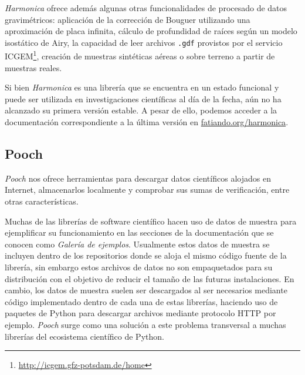 \emph{Harmonica} ofrece además algunas otras funcionalidades de procesado de
datos gravimétricos: aplicación de la corrección de Bouguer utilizando una
aproximación de placa infinita, cálculo de profundidad de raíces según un
modelo isostático de Airy, la capacidad de leer archivos \texttt{.gdf}
provistos por el servicio
ICGEM\footnote{\url{http://icgem.gfz-potsdam.de/home}}, creación de muestras
sintéticas aéreas o sobre terreno a partir de muestras reales.

Si bien \emph{Harmonica} es una librería que se encuentra en un estado funcional
y puede ser utilizada en investigaciones científicas al día de la fecha, aún no
ha alcanzado su primera versión estable.
A pesar de ello, podemos acceder a la documentación correspondiente a la última
versión en \href{https://www.fatiando.org/harmonica}{fatiando.org/harmonica}.






\subsection{Pooch}

\emph{Pooch} nos ofrece herramientas para descargar datos científicos alojados
en Internet, almacenarlos localmente y comprobar sus sumas de verificación,
entre otras características.

Muchas de las librerías de software científico hacen uso de datos de muestra
para ejemplificar su funcionamiento en las secciones de la documentación que se
conocen como \emph{Galería de ejemplos}.
Usualmente estos datos de muestra se incluyen dentro de los repositorios donde
se aloja el mismo código fuente de la librería, sin embargo estos archivos de
datos no son empaquetados para su distribución con el objetivo de reducir el
tamaño de las futuras instalaciones.
En cambio, los datos de muestra suelen ser descargados al ser necesarios
mediante código implementado dentro de cada una de estas librerías, haciendo
uso de paquetes de Python para descargar archivos mediante protocolo HTTP por
ejemplo.
\emph{Pooch} surge como una solución a este problema transversal a muchas
librerías del ecosistema científico de Python.

